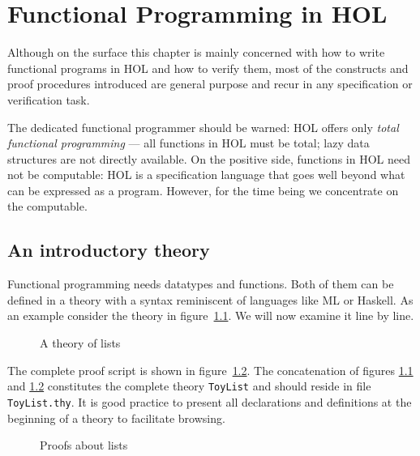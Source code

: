 \chapter{Functional Programming in HOL}

Although on the surface this chapter is mainly concerned with how to write
functional programs in HOL and how to verify them, most of the
constructs and proof procedures introduced are general purpose and recur in
any specification or verification task.

The dedicated functional programmer should be warned: HOL offers only
\emph{total functional programming} --- all functions in HOL must be total;
lazy data structures are not directly available. On the positive side,
functions in HOL need not be computable: HOL is a specification language that
goes well beyond what can be expressed as a program. However, for the time
being we concentrate on the computable.

\section{An introductory theory}
\label{sec:intro-theory}

Functional programming needs datatypes and functions. Both of them can be
defined in a theory with a syntax reminiscent of languages like ML or
Haskell. As an example consider the theory in figure~\ref{fig:ToyList}.
We will now examine it line by line.

\begin{figure}[htbp]
\begin{ttbox}\makeatother
\end{ttbox}
\caption{A theory of lists}
\label{fig:ToyList}
\end{figure}

{\makeatother}

The complete proof script is shown in figure~\ref{fig:ToyList-proofs}. The
concatenation of figures \ref{fig:ToyList} and \ref{fig:ToyList-proofs}
constitutes the complete theory \texttt{ToyList} and should reside in file
\texttt{ToyList.thy}. It is good practice to present all declarations and
definitions at the beginning of a theory to facilitate browsing.

\begin{figure}[htbp]
\begin{ttbox}\makeatother
\end{ttbox}
\caption{Proofs about lists}
\label{fig:ToyList-proofs}
\end{figure}

